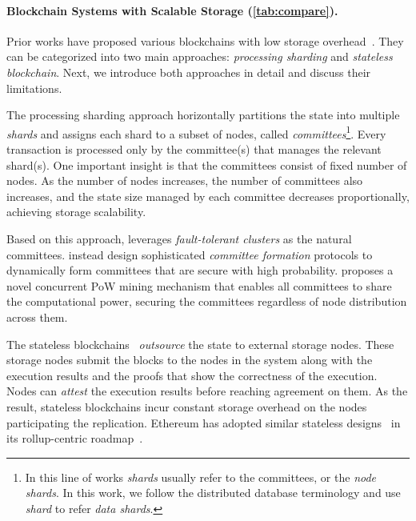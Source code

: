 \paragraph{Blockchain Systems with Scalable Storage (\autoref{tab:compare}).}
Prior works have proposed various blockchains with low storage overhead~\cite{ruan2021blockchains,el2019blockchaindb,hong2024gridb,kokoris2018omniledger,dang2019towards,zamani2018rapidchain,david2022gearbox,amiri2021sharper,gupta2020resilientdb,wang2019monoxide}.
They can be categorized into two main approaches: \emph{processing sharding} and \emph{stateless blockchain}.
Next, we introduce both approaches in detail and discuss their limitations.


The processing sharding approach horizontally partitions the state into multiple \emph{shards} and assigns each shard to a subset of nodes, called \emph{committees}\footnote{
    In this line of works \emph{shards} usually refer to the committees, or the \emph{node shards}.
    In this work, we follow the distributed database terminology and use \emph{shard} to refer \emph{data shards}.
}.
Every transaction is processed only by the committee(s) that manages the relevant shard(s).
One important insight is that the committees consist of fixed number of nodes.
As the number of nodes increases, the number of committees also increases, and the state size managed by each committee decreases proportionally, achieving storage scalability.

Based on this approach, \cite{ruan2021blockchains,el2019blockchaindb,hong2024gridb,amiri2021sharper,hellings2021byshard} leverages \emph{fault-tolerant clusters} as the natural committees.
\cite{kokoris2018omniledger,dang2019towards,zamani2018rapidchain} instead design sophisticated \emph{committee formation} protocols to dynamically form committees that are secure with high probability.
\cite{wang2019monoxide} proposes a novel concurrent PoW mining mechanism that enables all committees to share the computational power, securing the committees regardless of node distribution across them.

The stateless blockchains~\cite{xu2021slimchain,boneh2019batching,chepurnoy2018edrax,tomescu2020aggregatable,xu2022l2chain,lee2020replicated} \emph{outsource} the state to external storage nodes.
These storage nodes submit the blocks to the nodes in the system along with the execution results and the proofs that show the correctness of the execution.
Nodes can \emph{attest} the execution results before reaching agreement on them.
As the result, stateless blockchains incur constant storage overhead on the nodes participating the replication.
Ethereum has adopted similar stateless designs~\cite{eip4844} in its rollup-centric roadmap~\cite{ethereum_scaling_docs,vbuterin2020rolluproadmap}.

